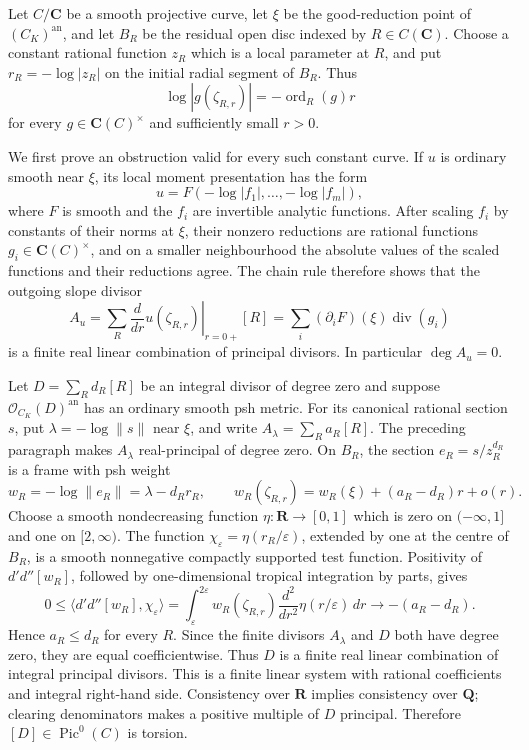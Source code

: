 Let \(C/\mathbf C\) be a smooth projective curve, let \(\xi\) be the
good-reduction point of \((C_K)^{\mathrm{an}}\), and let \(B_R\) be the
residual open disc indexed by \(R\in C(\mathbf C)\).  Choose a constant
rational function \(z_R\) which is a local parameter at \(R\), and put
\(r_R=-\log|z_R|\) on the initial radial segment of \(B_R\).  Thus
\[
  \log|g(\zeta_{R,r})|=-\operatorname{ord}_R(g)r
\]
for every \(g\in\mathbf C(C)^\times\) and sufficiently small \(r>0\).

We first prove an obstruction valid for every such constant curve.  If
\(u\) is ordinary smooth near \(\xi\), its local moment presentation has
the form
\[
  u=F(-\log|f_1|,\ldots,-\log|f_m|),
\]
where \(F\) is smooth and the \(f_i\) are invertible analytic functions.
After scaling \(f_i\) by constants of their norms at \(\xi\), their nonzero
reductions are rational functions \(g_i\in\mathbf C(C)^\times\), and on a
smaller neighbourhood the absolute values of the scaled functions and
their reductions agree.  The chain rule therefore shows that the outgoing
slope divisor
\[
 A_u=\sum_R
  \left.\frac{d}{dr}u(\zeta_{R,r})\right|_{r=0+}[R]
   =\sum_i (\partial_iF)(\xi)\operatorname{div}(g_i)
\]
is a finite real linear combination of principal divisors.  In particular
\(\deg A_u=0\).

Let \(D=\sum_Rd_R[R]\) be an integral divisor of degree zero and suppose
\(\mathcal O_{C_K}(D)^{\mathrm{an}}\) has an ordinary smooth psh metric.
For its canonical rational section \(s\), put
\(\lambda=-\log\|s\|\) near \(\xi\), and write
\(A_\lambda=\sum_Ra_R[R]\).  The preceding paragraph makes
\(A_\lambda\) real-principal of degree zero.  On \(B_R\), the section
\(e_R=s/z_R^{d_R}\) is a frame with psh weight
\[
 w_R=-\log\|e_R\|=\lambda-d_Rr_R,
 \qquad
 w_R(\zeta_{R,r})=w_R(\xi)+(a_R-d_R)r+o(r).
\]
Choose a smooth nondecreasing function \(\eta\colon\mathbf R\to[0,1]\)
which is zero on \((-\infty,1]\) and one on \([2,\infty)\).  The function
\(\chi_\varepsilon=\eta(r_R/\varepsilon)\), extended by one at the centre
of \(B_R\), is a smooth nonnegative compactly supported test function.
Positivity of \(d'd''[w_R]\), followed by one-dimensional tropical
integration by parts, gives
\[
  0\leq \langle d'd''[w_R],\chi_\varepsilon\rangle
    =\int_\varepsilon^{2\varepsilon}
       w_R(\zeta_{R,r})\frac{d^2}{dr^2}
       \eta(r/\varepsilon)\,dr
    \longrightarrow -(a_R-d_R).
\]
Hence \(a_R\leq d_R\) for every \(R\).  Since the finite divisors
\(A_\lambda\) and \(D\) both have degree zero, they are equal
coefficientwise.  Thus \(D\) is a finite real linear combination of
integral principal divisors.  This is a finite linear system with rational
coefficients and integral right-hand side.  Consistency over \(\mathbf R\)
implies consistency over \(\mathbf Q\); clearing denominators makes a
positive multiple of \(D\) principal.  Therefore
\([D]\in\operatorname{Pic}^0(C)\) is torsion.

